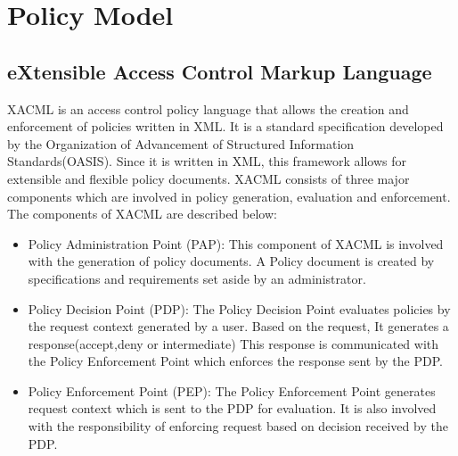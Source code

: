 \section{Policy Model}

\subsection{eXtensible Access Control Markup Language}
 XACML is an access control policy language that allows the creation and enforcement of policies written in XML. It is a standard specification developed by the Organization of Advancement of Structured Information Standards(OASIS). Since it is written in XML, this framework allows for extensible and flexible policy documents. XACML consists of three major components which are involved in policy generation, evaluation and enforcement. The components of XACML are described below: 
 
 
 \begin{itemize}
 
 \item Policy Administration Point (PAP): This component of XACML
is involved with the generation of policy documents. A Policy document is created by specifications and requirements set aside by an administrator.

 \item Policy Decision Point (PDP): The Policy Decision Point evaluates policies by the request context generated by a user. Based on the request, It generates a response(accept,deny or intermediate) This response is communicated with the Policy Enforcement Point which enforces the response sent by the PDP.


\item Policy Enforcement Point (PEP):  The Policy Enforcement Point generates request context which is sent to the PDP for evaluation. It is also involved with the responsibility of enforcing request based on decision received by the PDP.

 \end{itemize}
 
 
 
